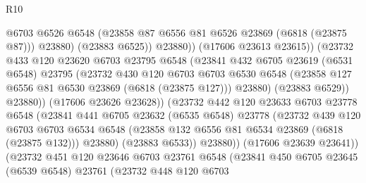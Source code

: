 \begin{lexlean}{R10}
\begin{coremodule}
                                  @6703
                                  @6526
                                  @6548
                                  (@23858 @87 @6556 @81 @6526 @23869 (@6818 (@23875 @87)))
                                  @23880)
                                (@23883 @6525))
                              @23880))
                          (@17606 @23613 @23615))
                        (@23732
                          @433
                          @120
                          @23620
                          @6703
                          @23795
                          @6548
                          (@23841
                            @432
                            @6705
                            @23619
                            (@6531 @6548)
                            @23795
                            (@23732
                              @430
                              @120
                              @6703
                              @6703
                              @6530
                              @6548
                              (@23858 @127 @6556 @81 @6530 @23869 (@6818 (@23875 @127)))
                              @23880)
                            (@23883 @6529))
                          @23880))
                      (@17606 @23626 @23628))
                    (@23732
                      @442
                      @120
                      @23633
                      @6703
                      @23778
                      @6548
                      (@23841
                        @441
                        @6705
                        @23632
                        (@6535 @6548)
                        @23778
                        (@23732
                          @439
                          @120
                          @6703
                          @6703
                          @6534
                          @6548
                          (@23858 @132 @6556 @81 @6534 @23869 (@6818 (@23875 @132)))
                          @23880)
                        (@23883 @6533))
                      @23880))
                  (@17606 @23639 @23641))
                (@23732
                  @451
                  @120
                  @23646
                  @6703
                  @23761
                  @6548
                  (@23841
                    @450
                    @6705
                    @23645
                    (@6539 @6548)
                    @23761
                    (@23732
                      @448
                      @120
                      @6703

\end{coremodule}
\end{lexlean}
